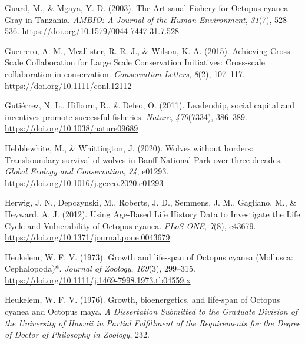 \documentclass[
  12pt,
]{article}
\newlength{\cslhangindent}
\newlength{\cslentryspacingunit} %
\newenvironment{CSLReferences}[2] %
 {%
  \setlength{\parindent}{0pt}
  \ifodd #1
  \let\oldpar\par
  \def\par{\hangindent=\cslhangindent\oldpar}
  \fi
  \setlength{\parskip}{#2\cslentryspacingunit}
 }%
 {}
\begin{document}
\begin{CSLReferences}{1}{2}
\leavevmode{}%
Guard, M., \& Mgaya, Y. D. (2003). The {Artisanal} {Fishery} for {Octopus} cyanea {Gray} in {Tanzania}. \emph{AMBIO: A Journal of the Human Environment}, \emph{31}(7), 528--536. \url{https://doi.org/10.1579/0044-7447-31.7.528}

\leavevmode{}%
Guerrero, A. M., Mcallister, R. R. J., \& Wilson, K. A. (2015). Achieving {Cross}-{Scale} {Collaboration} for {Large} {Scale} {Conservation} {Initiatives}: {Cross}-scale collaboration in conservation. \emph{Conservation Letters}, \emph{8}(2), 107--117. \url{https://doi.org/10.1111/conl.12112}

\leavevmode{}%
Gutiérrez, N. L., Hilborn, R., \& Defeo, O. (2011). Leadership, social capital and incentives promote successful fisheries. \emph{Nature}, \emph{470}(7334), 386--389. \url{https://doi.org/10.1038/nature09689}

\leavevmode{}%
Hebblewhite, M., \& Whittington, J. (2020). Wolves without borders: {Transboundary} survival of wolves in {Banff} {National} {Park} over three decades. \emph{Global Ecology and Conservation}, \emph{24}, e01293. \url{https://doi.org/10.1016/j.gecco.2020.e01293}

\leavevmode{}%
Herwig, J. N., Depczynski, M., Roberts, J. D., Semmens, J. M., Gagliano, M., \& Heyward, A. J. (2012). Using {Age}-{Based} {Life} {History} {Data} to {Investigate} the {Life} {Cycle} and {Vulnerability} of {Octopus} cyanea. \emph{PLoS ONE}, \emph{7}(8), e43679. \url{https://doi.org/10.1371/journal.pone.0043679}

\leavevmode{}%
Heukelem, W. F. V. (1973). Growth and life‐span of {Octopus} cyanea ({Mollusca}: {Cephalopoda})*. \emph{Journal of Zoology}, \emph{169}(3), 299--315. \url{https://doi.org/10.1111/j.1469-7998.1973.tb04559.x}

\leavevmode{}%
Heukelem, W. F. V. (1976). Growth, bioenergetics, and life-span of {Octopus} cyanea and {Octopus} maya. \emph{A Dissertation Submitted to the Graduate Division of the University of Hawaii in Partial Fulfillment of the Requirements for the Degree of Doctor of Philosophy in Zoology}, 232.


\end{CSLReferences}
\end{document}
